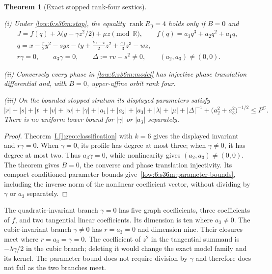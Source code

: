 \documentclass[11pt]{amsart}
\newtheorem{theorem}{Theorem}[section]
\theoremstyle{definition}
\theoremstyle{remark}
\numberwithin{equation}{section}
\newcommand{\partIref}[1]{\hyperref[I:#1]{I.\ref*{I:#1}}}
\begin{document}
\begin{theorem}[Exact stopped rank-four sextics]\label{low:6:s36m:classification}

\noindent\textup{(i)} Under \eqref{low:6:s36m:stop}, the equality $\operatorname{rank}R_{\widehat J}=4$ holds only if $B=0$ and
\begin{equation}\label{low:6:s36m:model}
\begin{gathered}
J=f(q)+\lambda\bigl(y-\gamma z^2/2\bigr)+\mu z\pmod{\mathbb R},\qquad f(q)=a_3q^3+a_2q^2+a_1q,\\
q=x-\frac r2y^2-syz-ty+\frac{t\gamma-v}{2}z^2+\frac{s\gamma}{3}z^3-wz,\\
r\gamma=0,\qquad a_3\gamma=0,\qquad \Delta:=rv-s^2\ne0,\qquad (a_2,a_3)\ne(0,0).
\end{gathered}
\end{equation}

\noindent\textup{(ii)} Conversely every phase in \eqref{low:6:s36m:model} has injective phase translation differential and, with $B=0$, upper-affine orbit rank four.

\noindent\textup{(iii)} On the bounded stopped stratum its displayed parameters satisfy
\begin{equation}\label{low:6:s36m:parameter-bounds}
|r|+|s|+|t|+|v|+|w|+|\gamma|+|a_1|+|a_2|+|a_3|+|\lambda|+|\mu|+|\Delta|^{-1}+\bigl(a_2^2+a_3^2\bigr)^{-1/2}\le P^C.
\end{equation}
There is no uniform lower bound for $|\gamma|$ or $|a_3|$ separately.
\end{theorem}
\begin{proof}
Theorem~\partIref{geo:classification} with $k=6$ gives the displayed invariant and $r\gamma=0$. When $\gamma=0$, its profile has degree at most three; when $\gamma\ne0$, it has degree at most two. Thus $a_3\gamma=0$, while nonlinearity gives $(a_2,a_3)\ne(0,0)$. The theorem gives $B=0$, the converse and phase translation injectivity. Its compact conditioned parameter bounds give~\eqref{low:6:s36m:parameter-bounds}, including the inverse norm of the nonlinear coefficient vector, without dividing by $\gamma$ or $a_3$ separately.
\end{proof}

The quadratic-invariant branch $\gamma=0$ has five graph coefficients, three coefficients of $f$, and two tangential linear coefficients. Its dimension is ten where $a_3\ne0$. The cubic-invariant branch $\gamma\ne0$ has $r=a_3=0$ and dimension nine. Their closures meet where $r=a_3=\gamma=0$. The coefficient of $z^2$ in the tangential summand is $-\lambda\gamma/2$ in the cubic branch; deleting it would change the exact model family and its kernel. The parameter bound does not require division by $\gamma$ and therefore does not fail as the two branches meet.
\end{document}
